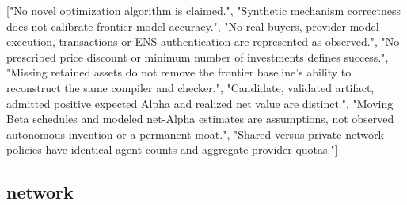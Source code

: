 \documentclass[10pt]{article}
\begin{document}
["No novel optimization algorithm is claimed.", "Synthetic mechanism correctness does not calibrate frontier model accuracy.", "No real buyers, provider model execution, transactions or ENS authentication are represented as observed.", "No prescribed price discount or minimum number of investments defines success.", "Missing retained assets do not remove the frontier baseline's ability to reconstruct the same compiler and checker.", "Candidate, validated artifact, admitted positive expected Alpha and realized net value are distinct.", "Moving Beta schedules and modeled net-Alpha estimates are assumptions, not observed autonomous invention or a permanent moat.", "Shared versus private network policies have identical agent counts and aggregate provider quotas."]

\subsection*{network}
\end{document}
